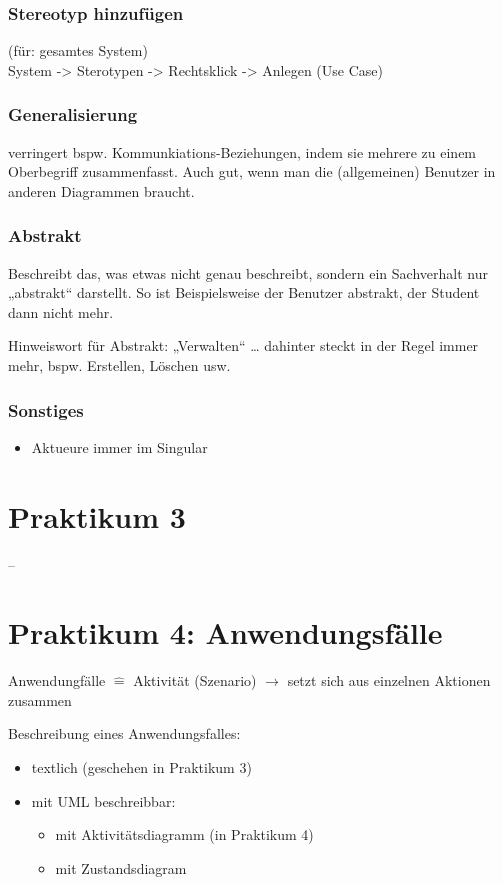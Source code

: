\subsection{Stereotyp hinzufügen}
(für: gesamtes System)\\
System -> Sterotypen -> Rechtsklick -> Anlegen (Use Case)

\subsection{Generalisierung}
verringert bspw. Kommunkiations-Beziehungen, indem sie mehrere zu einem Oberbegriff zusammenfasst. Auch gut, wenn man die (allgemeinen) Benutzer in anderen Diagrammen braucht.

\subsection{Abstrakt}
Beschreibt das, was etwas nicht genau beschreibt, sondern ein Sachverhalt nur „abstrakt“ darstellt. So ist Beispielsweise der Benutzer abstrakt, der Student dann nicht mehr.

Hinweiswort für Abstrakt: „Verwalten“ … dahinter steckt in der Regel immer mehr, bspw. Erstellen, Löschen usw.
\subsection{Sonstiges}
\begin{itemize}
\item Aktueure immer im Singular
\end{itemize}

\chapter{Praktikum 3}
--

\chapter{Praktikum 4: Anwendungsfälle}
Anwendungfälle $\hat{=}$ Aktivität (Szenario) $\to$ setzt sich aus einzelnen Aktionen zusammen

Beschreibung eines Anwendungsfalles:
\begin{itemize}
\item textlich (geschehen in Praktikum 3)
\item mit UML beschreibbar:
\begin{itemize}
\item mit Aktivitätsdiagramm (in Praktikum 4)
\item mit Zustandsdiagram
\end{itemize}
\end{itemize}

